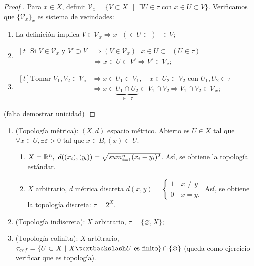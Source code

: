 \documentclass[a4paper]{report}
\begin{document}
	\begin{proof}[Proof ]
		Para $x \in X$, definir $\mathcal{V}_x = \{ V \subset X \text{ } | \text{ } \exists U \in \tau \text{ con } x \in U \subset V \}$. Verificamos que $\{ \mathcal{V}_x \}_x$ es sistema de vecindades:

		\begin{enumerate}
			\item La definición implica $V \in \mathcal{V}_x \Rightarrow x \text{ } (\in U \subset) \text{ } \in V$;

			\item $\begin{aligned}[t]
				\text{Si } V \in \mathcal{V}_x \text{ y } V' \supset V & \Rightarrow (V \in \mathcal{V}_x) \text{ } x \in U \subset \text{ } (U \in \tau) \\
				& \Rightarrow x \in U \subset V' \Rightarrow V' \in \mathcal{V}_x;
			\end{aligned}$

			\item $\begin{aligned}[t]
				\text{Tomar } V_1,V_2 \in \mathcal{V}_x & \Rightarrow x \in U_1 \subset V_1, \quad x \in U_2 \subset V_2 \text{ con } U_1,U_2 \in \tau \\
				& \Rightarrow x \in \underbrace{U_1 \cap U_2}_{\in \text{ } \tau} \subset V_1 \cap V_2 \Rightarrow V_1 \cap V_2 \in \mathcal{V}_x;
			\end{aligned}$
		\end{enumerate}

		(falta demostrar unicidad).
	\end{proof}

	\begin{eg} \text{}
		\begin{enumerate}
			\item (Topología métrica): $(X,d)$ espacio métrico. Abierto es $U \in X$ tal que $\forall x \in U, \exists \varepsilon > 0$ tal que $x \in B_{\varepsilon} (x) \subset U$.
			\begin{enumerate}
				\item $X = \mathbb{R}^n, \text{ } d((x_i),(y_i)) = \sqrt{ \\sum_{i=1}^{n} (x_i - y_i)^2 }$. Así, se obtiene la topología estándar.

				\item $X$ arbitrario, $d$ métrica discreta $d(x,y) = \begin{cases}
					1 \quad x \neq y \\
					0 \quad x = y.
				\end{cases}$ Así, se obtiene la topología discreta: $\tau = 2^X$.
			\end{enumerate}

			\item (Topología indiscreta): $X$ arbitrario, $\tau = \{ \varnothing , X \}$;

			\item (Topología cofinita): $X$ arbitrario, $\tau_{cof} = \{ U \subset X \text{ | } X \textbackslash U \text{ es finito} \} \cap \{ \varnothing \}$ (queda como ejercicio verificar que es topología).
		\end{enumerate}
	\end{eg}
\end{document}
